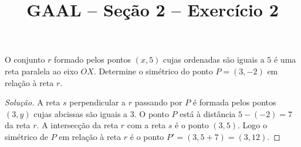 \documentclass[a4paper,11pt]{article}
\title{GAAL -- Seção 2 -- Exercício 2}
\author{\empty}
\date{\empty}
\newcommand\onlyinsubfileone\maketitle
\begin{document}
\onlyinsubfileone

\begin{exercicio-gaal}[E2.S2]
  O conjunto $r$ formado pelos pontos $(x,5)$ cujas ordenadas são iguais a $5$ é uma reta paralela ao eixo $OX$.
  Determine o simétrico do ponto $P = (3,-2)$ em relação à reta $r$.
\end{exercicio-gaal}

\begin{proof}[Solução]
  A reta $s$ perpendicular a $r$ passando por $P$ é formada pelos pontos $(3,y)$ cujas abcissas são iguais a $3$.
  O ponto $P$ está à distância $5-(-2) = 7$ da reta $r$.
  A intersecção da reta $r$ com a reta $s$ é o ponto $(3,5)$.
  Logo o simétrico de $P$ em relação à reta $r$ é o ponto $P' = (3,5+7) = (3,12)$.
\end{proof}
\end{document}
